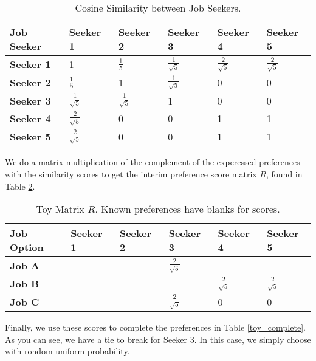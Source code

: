 \begin{table}[h!]
\begin{center}
\caption{Cosine Similarity between Job Seekers.}
\label{toy_similarity}
\begin{tabular}{l|l|l|l|l|l}
\hline 
\textbf{Job Seeker} & \textbf{Seeker 1} &  \textbf{Seeker 2} & \textbf{Seeker 3} &\textbf{Seeker 4} &\textbf{Seeker 5} \\
\hline
\textbf{Seeker 1} & 1 & $\frac{1}{5}$ & $\frac{1}{\sqrt{5}}$ & $\frac{2}{\sqrt{5}}$ & $\frac{2}{\sqrt{5}}$\\
\textbf{Seeker 2} & $\frac{1}{5}$ & 1 & $\frac{1}{\sqrt{5}}$ & 0 & 0 \\
\textbf{Seeker 3} &  $\frac{1}{\sqrt{5}}$ & $\frac{1}{\sqrt{5}}$ & 1 & 0 & 0 \\
\textbf{Seeker 4} & $\frac{2}{\sqrt{5}}$ & 0  & 0 & 1 & 1 \\
\textbf{Seeker 5} & $\frac{2}{\sqrt{5}}$ & 0  & 0 & 1 & 1\\
\hline 
\end{tabular}
\end{center}
\end{table}

We do a matrix multiplication of the complement of the experessed preferences with the similarity scores to get the interim preference score matrix $R$, found in Table \ref{toy_scores}.

\begin{table}[h!]
\begin{center}
\caption{Toy Matrix $R$. Known preferences have blanks for scores.}
\label{toy_scores}
\begin{tabular}{l|l|l|l|l|l}
\hline 
\textbf{Job Option} & \textbf{Seeker 1} &  \textbf{Seeker 2} & \textbf{Seeker 3} &\textbf{Seeker 4} &\textbf{Seeker 5} \\
\hline
\textbf{Job A} &  &  & $\frac{2}{\sqrt{5}}$ &  & \\
\textbf{Job B} &  &  &  &$\frac{2}{\sqrt{5}}$ &$\frac{2}{\sqrt{5}}$\\
\textbf{Job C} &  &  & $\frac{2}{\sqrt{5}}$ &0 & 0\\
\hline 
\end{tabular}
\end{center}
\end{table}

Finally, we use these scores to complete the preferences in Table \ref{toy_complete}. As you can see, we have a tie to break for Seeker 3. In this case, we simply choose with rondom uniform probability.

